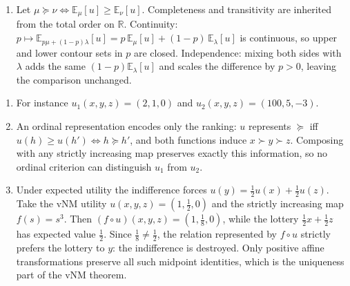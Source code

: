 \documentclass[11pt]{article}
\newcommand{\R}{\mathbb{R}}
\newcommand{\pref}{\succcurlyeq}
\newcommand{\strictpref}{\succ}
\begin{document}
\begin{solution}
\begin{enumerate}[label=(\alph*)]
\begin{align*}
&=u'(w)+\bigl(u'(b)-u'(w)\bigr)u(h).
\end{align*}
This is the required form $u'=a+b\,u$, with intercept $u'(w)$ and slope
$u'(b)-u'(w)$, the latter strictly positive because $b\strictpref w$ and
$u'$ represents $\pref$. (Note the statement's scalars $a,b$ are unrelated
to the trajectories $b,w$ of part~(a); the letter $b$ does double duty here,
so read $u'(b)$ as the utility of the best trajectory throughout.)
\item Let $\mu\pref\nu\iff \mathbb{E}_\mu[u]\geq\mathbb{E}_\nu[u]$.
Completeness and transitivity are inherited from the total order on $\R$.
Continuity: $p\mapsto \mathbb{E}_{p\mu+(1-p)\lambda}[u]
=p\,\mathbb{E}_\mu[u]+(1-p)\,\mathbb{E}_\lambda[u]$ is continuous, so upper
and lower contour sets in $p$ are closed. Independence: mixing both sides
with $\lambda$ adds the same $(1-p)\mathbb{E}_\lambda[u]$ and scales the
difference by $p>0$, leaving the comparison unchanged.
\end{enumerate}
\end{solution}

\begin{solution}
\begin{enumerate}[label=(\alph*)]
\item For instance $u_1(x,y,z)=(2,1,0)$ and $u_2(x,y,z)=(100,5,-3)$.
\item An ordinal representation encodes only the ranking: $u$ represents
$\pref$ iff $u(h)\geq u(h')\iff h\pref h'$, and both functions induce
$x\strictpref y\strictpref z$. Composing with any strictly increasing map
preserves exactly this information, so no ordinal criterion can distinguish
$u_1$ from $u_2$.
\item Under expected utility the indifference forces
$u(y)=\tfrac12 u(x)+\tfrac12 u(z)$. Take the vNM utility
$u(x,y,z)=(1,\tfrac12,0)$ and the strictly increasing map $f(s)=s^3$. Then
$(f\circ u)(x,y,z)=(1,\tfrac18,0)$, while the lottery
$\tfrac12 x+\tfrac12 z$ has expected value $\tfrac12$. Since
$\tfrac18\neq\tfrac12$, the relation represented by $f\circ u$ strictly
prefers the lottery to $y$: the indifference is destroyed. Only positive
affine transformations preserve all such midpoint identities, which is the
uniqueness part of the vNM theorem.
\end{enumerate}
\end{solution}
\end{document}
